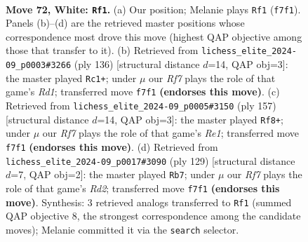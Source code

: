 \documentclass[11pt]{article}
\begin{document}
\clearpage

\begin{figure}[p]\centering
\begin{subfigure}{0.46\textwidth}\centering
\resizebox{\linewidth}{!}{%
\newchessgame
\chessboard[
  setfen={6R1/5R2/3k4/8/1P2b3/8/2r5/3K4 w - - 17 72},
  showmover=false,
  pgfstyle=straightmove, color=movearrow, markmove={f7-f1}
]}
\caption{}
\end{subfigure}\hfill
\begin{subfigure}{0.46\textwidth}\centering
\resizebox{\linewidth}{!}{%
\newchessgame
\chessboard[
  setfen={8/1r6/8/2kb4/8/K7/8/3R4 w - - 36 69},
  showmover=false,
  pgfstyle=straightmove, color=movearrow, markmove={d1-c1}
]}
\caption{}
\end{subfigure}
\\[4pt]
\begin{subfigure}{0.46\textwidth}\centering
\resizebox{\linewidth}{!}{%
\newchessgame
\chessboard[
  setfen={4r3/8/8/7k/4BK2/8/6R1/8 b - - 8 79},
  showmover=false,
  pgfstyle=straightmove, color=movearrow, markmove={e8-f8}
]}
\caption{}
\end{subfigure}\hfill
\begin{subfigure}{0.46\textwidth}\centering
\resizebox{\linewidth}{!}{%
\newchessgame
\chessboard[
  setfen={6R1/3r4/7k/4Kp2/8/1B6/8/8 b - - 0 65},
  showmover=false,
  pgfstyle=straightmove, color=movearrow, markmove={d7-b7}
]}
\caption{}
\end{subfigure}
\caption{\textbf{Move 72, White: \texttt{Rf1}.} (a) Our position; Melanie plays \texttt{Rf1} (\texttt{f7f1}). Panels (b)--(d) are the retrieved master positions whose correspondence most drove this move (highest QAP objective among those that transfer to it). (b) Retrieved from \texttt{lichess\_elite\_2024-09\_p0003\#3266} (ply 136) [structural distance $d$=14, QAP obj=3]: the master played \texttt{Rc1+}; under $\mu$ our \emph{Rf7} plays the role of that game's \emph{Rd1}; transferred move \texttt{f7f1} \textbf{(endorses this move)}. (c) Retrieved from \texttt{lichess\_elite\_2024-09\_p0005\#3150} (ply 157) [structural distance $d$=14, QAP obj=3]: the master played \texttt{Rf8+}; under $\mu$ our \emph{Rf7} plays the role of that game's \emph{Re1}; transferred move \texttt{f7f1} \textbf{(endorses this move)}. (d) Retrieved from \texttt{lichess\_elite\_2024-09\_p0017\#3090} (ply 129) [structural distance $d$=7, QAP obj=2]: the master played \texttt{Rb7}; under $\mu$ our \emph{Rf7} plays the role of that game's \emph{Rd2}; transferred move \texttt{f7f1} \textbf{(endorses this move)}. Synthesis: 3 retrieved analogs transferred to \texttt{Rf1} (summed QAP objective 8, the strongest correspondence among the candidate moves); Melanie committed it via the \texttt{search} selector.}
\label{fig:thought-m142}
\end{figure}
\end{document}
